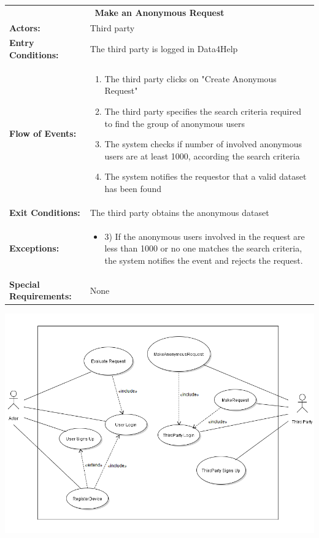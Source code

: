 \begin{table}[H]
	\centering
	{\renewcommand{\arraystretch}{1.5}%
		\begin{tabular}{|@{\hspace{2em}} p{4cm} @{}| p{11cm} @{\qquad}|}
			\cline{1-2}
			\multicolumn{2}{|c|}{\textbf{Make an Anonymous Request}} \\ \cline{1-2}
			\textbf{Actors:} & Third party \\ \cline{1-2}
			\textbf{Entry Conditions:} & The third party is logged in Data4Help \\ \cline{1-2}
			\textbf{Flow of Events:} & 
			\begin{enumerate}[itemsep=-0.2em, topsep=0em]
				\item The third party clicks on "Create Anonymous Request"
				\item The third party specifies the search criteria required to find the group of anonymous users
				\item The system checks if number of involved anonymous users are at least 1000, according the search criteria
				\item The system notifies the requestor that a valid dataset has been found
			\end{enumerate}\\ \cline{1-2}
			\textbf{Exit Conditions:} & The third party obtains the anonymous dataset \\ \cline{1-2}
			\textbf{Exceptions:} & 
			\begin{itemize} [itemsep=-0.2em, topsep=0em]
				\item 3) If the anonymous users involved in the request are less than 1000 or no one matches the search criteria, the system notifies the event and rejects the request.
			\end{itemize} \\ \cline{1-2}
			\textbf{Special Requirements:} & None \\ \hline
	\end{tabular}} \quad
\end{table}


\begin{center}
	\includegraphics[scale=1.1]{Images/UML/D4H_usecase.png}
\end{center}

